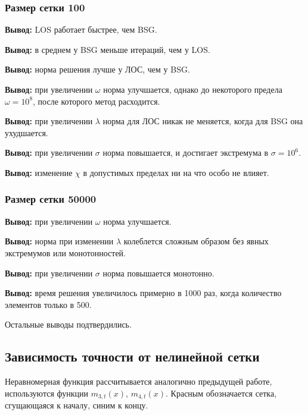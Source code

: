 \subsubsection{Размер сетки 100}


\noindent\textbf{Вывод:} LOS работает быстрее, чем BSG.

\noindent\textbf{Вывод:} в среднем у BSG меньше итераций, чем у LOS.

\noindent\textbf{Вывод:} норма решения лучше у ЛОС, чем у BSG.

\noindent\textbf{Вывод:} при увеличении $\omega$ норма улучшается, однако до некоторого предела $\omega = 10^8$, после которого метод расходится.

\noindent\textbf{Вывод:} при увеличении $\lambda$ норма для ЛОС никак не меняется, когда для BSG она ухудшается.

\noindent\textbf{Вывод:} при увеличении $\sigma$ норма повышается, и достигает экстремума в $\sigma = 10^6$.

\noindent\textbf{Вывод:} изменение $\chi$ в допустимых пределах ни на что особо не влияет.

\subsubsection{Размер сетки 50000}


\noindent\textbf{Вывод:} при увеличении $\omega$ норма улучшается.

\noindent\textbf{Вывод:} норма при изменении $\lambda$ колеблется сложным образом без явных экстремумов или монотонностей.

\noindent\textbf{Вывод:} при увеличении $\sigma$ норма повышается монотонно.

\noindent\textbf{Вывод:} время решения увеличилось примерно в 1000 раз, когда количество элементов только в 500.

\noindent Остальные выводы подтвердились.

\subsection{Зависимость точности от нелинейной сетки}

Неравномерная функция рассчитывается аналогично предыдущей работе, используются функции $m_{3, t}(x)$, $m_{4, t}(x)$. Красным обозначается сетка, сгущающаяся к началу, синим к концу.

